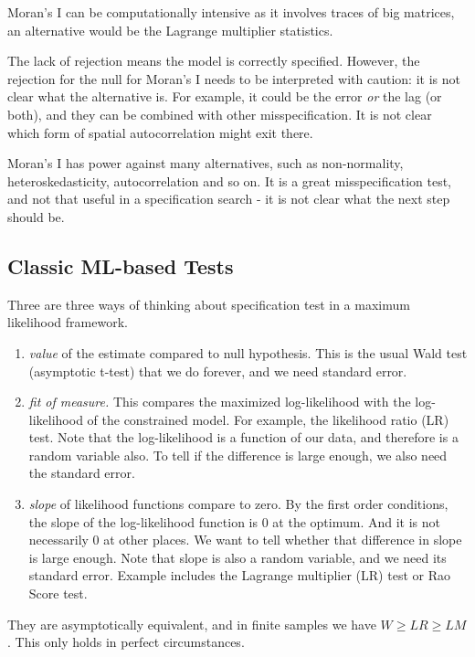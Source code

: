 \documentclass[11pt,a4paper]{amsart}
\theoremstyle{plain}
\theoremstyle{definition}
\begin{document}
 Moran's I can be computationally intensive as it involves traces of big matrices, an alternative would be the Lagrange multiplier statistics.
 
 The lack of rejection means the model is correctly specified. However, the rejection for the null for Moran's I needs to be interpreted with caution: it is not clear what the alternative is. For example, it could be the error \textit{or} the lag (or both), and they can be combined with other misspecification. It is not clear which form of spatial autocorrelation might exit there.
 
 Moran's I has power against many alternatives, such as non-normality, heteroskedasticity, autocorrelation and so on. It is a great misspecification test, and not that useful in a specification search - it is not clear what the next step should be.  
 
\subsection{Classic ML-based Tests}\hfill\par 
Three are three ways of thinking about specification test in a maximum likelihood framework. 
\begin{enumerate}
	\item \textit{value} of the estimate compared to null hypothesis. This is the usual Wald test (asymptotic t-test) that we do forever, and we need standard error. 
	\item  \textit{fit of measure.} This compares the maximized log-likelihood with the log-likelihood of the constrained model. For example, the likelihood ratio (LR) test. Note that the log-likelihood is a function of our data, and therefore is a random variable also. To tell if the difference is large enough, we also need the standard error.
	\item \textit{slope} of likelihood functions compare to zero. By the first order conditions, the slope of the log-likelihood function is $0$ at the optimum. And it is not necessarily $0$ at other places. We want to tell whether that difference in slope is large enough. Note that slope is also a random variable, and we need its standard error. Example includes the Lagrange multiplier (LR) test or Rao Score test.
\end{enumerate}

They are asymptotically equivalent, and in finite samples we have $W \geq LR \geq LM$. This only holds in perfect circumstances.
\end{document}
